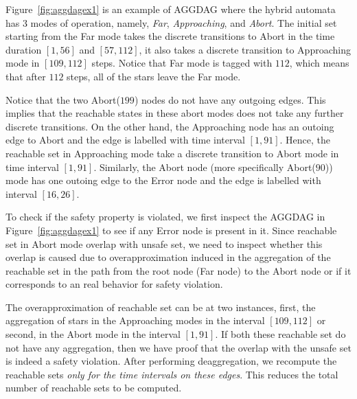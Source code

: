 \begin{example}
Figure~\ref{fig:aggdagex1} is an example of AGGDAG where the hybrid automata has 3 modes of operation, namely, {\em Far}, {\em Approaching}, and {\em Abort}. The initial set starting from the Far mode takes the discrete transitions to Abort in the time duration $[1,56]$ and $[57,112]$, it also takes a discrete transition to Approaching mode in $[109,112]$ steps. Notice that Far mode is tagged with $112$, which means that after $112$ steps, all of the stars leave the Far mode. 

Notice that the two Abort($199$) nodes do not have any outgoing edges. This implies that the reachable states in these abort modes does not take any further discrete transitions. On the other hand, the Approaching node has an outoing edge to Abort and the edge is labelled with time interval $[1,91]$. Hence, the reachable set in Approaching mode take a discrete transition to Abort mode in time interval $[1,91]$. Similarly, the Abort node (more specifically Abort($90$)) mode has one outoing edge to the Error node and the edge is labelled with interval $[16,26]$.

To check if the safety property is violated, we first inspect the AGGDAG in Figure~\ref{fig:aggdagex1} to see if any Error node is present in it. Since reachable set in Abort mode overlap with unsafe set, we need to inspect whether this overlap is caused due to overapproximation induced in the aggregation of the reachable set in the path from the root node (Far node) to the Abort node or if it corresponds to an real behavior for safety violation. 

The overapproximation of reachable set can be at two instances, first, the aggregation of stars in the Approaching modes in the interval $[109, 112]$ or second, in the Abort mode in the interval $[1,91]$.  If both these reachable set do not have any aggregation, then we have proof that the overlap with the unsafe set is indeed a safety violation. After performing deaggregation, we recompute the reachable sets \emph{only for the time intervals on these edges}. This reduces the total number of reachable sets to be computed.
\end{example}



